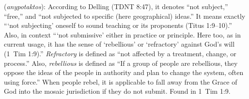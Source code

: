 \item[Rebellious,]

(\textit{anypotaktos}):
According to Delling (TDNT 8:47), it denotes ``not subject,'' ``free,'' and ``not subjected to specific (here geographical) ideas.'' It means exactly ```not subjecting' oneself to sound teaching or its proponents (Titus 1:9--10).'' Also, in context ```not submissive' either in practice or principle. Here too, as in current usage, it has the sense of `rebellious' or `refractory' against God's will (1~Tim 1:9).'' \emph{Refractory} is defined as ``not affected by a treatment, change, or process.'' Also, \emph{rebellious} is defined as ``If a group of people are rebellious, they oppose the ideas of the people in authority and plan to change the system, often using force.'' When people rebel, it is applicable to fall away from the Grace of God into the mosaic jurisdiction if they do not submit.
Found in 1~Tim 1:9.

